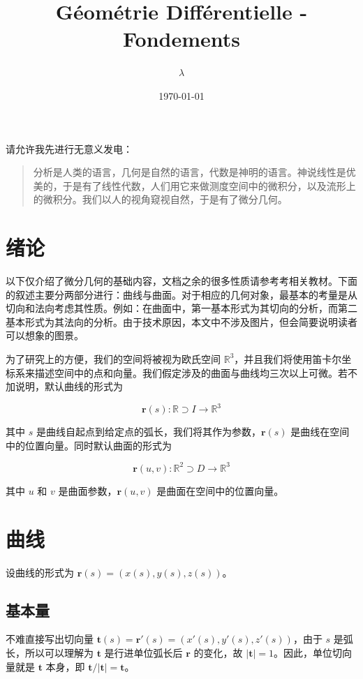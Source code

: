 \documentclass[a4paper, 12pt]{article}
\begin{document}
	
	\title{Géométrie Différentielle - Fondements}
	\author{$\lambda$}
	\date{\today}
	\maketitle
	
    \noindent 请允许我先进行无意义发电：

    \begin{quotation}
        分析是人类的语言，几何是自然的语言，代数是神明的语言。神说线性是优美的，于是有了线性代数，人们用它来做测度空间中的微积分，以及流形上的微积分。我们以人的视角窥视自然，于是有了微分几何。
    \end{quotation}

	\section{绪论}
    
    以下仅介绍了微分几何的基础内容，文档之余的很多性质请参考考相关教材。下面的叙述主要分两部分进行：曲线与曲面。对于相应的几何对象，最基本的考量是从切向和法向考虑其性质。例如：在曲面中，第一基本形式为其切向的分析，而第二基本形式为其法向的分析。由于技术原因，本文中不涉及图片，但会简要说明读者可以想象的图景。

    为了研究上的方便，我们的空间将被视为欧氏空间 $\mathbb{R}^3$，并且我们将使用笛卡尔坐标系来描述空间中的点和向量。我们假定涉及的曲面与曲线均三次以上可微。若不加说明，默认曲线的形式为

    \[
    \boldsymbol r (s): \mathbb R \supset I \to \mathbb{R}^3
    \]

    其中 $s$ 是曲线自起点到给定点的弧长，我们将其作为参数，$\boldsymbol r(s)$ 是曲线在空间中的位置向量。同时默认曲面的形式为

    \[
    \boldsymbol r(u,v): \mathbb R^2 \supset D \to \mathbb R^3
    \]

    其中 $u$ 和 $v$ 是曲面参数，$\boldsymbol r(u,v)$ 是曲面在空间中的位置向量。

    \section{曲线}

    设曲线的形式为 $\boldsymbol r(s)=(x(s), y(s), z(s))$。

    \subsection{基本量}

    不难直接写出切向量 $\boldsymbol t(s) = \boldsymbol r'(s)=(x'(s), y'(s), z'(s))$，由于 $s$ 是弧长，所以可以理解为 $\boldsymbol t$ 是行进单位弧长后 $\boldsymbol r$ 的变化，故 $|\boldsymbol t|=1$。因此，单位切向量就是 $\boldsymbol t$ 本身，即 $\boldsymbol t/|\boldsymbol t| = \boldsymbol t$。
    
\end{document}

